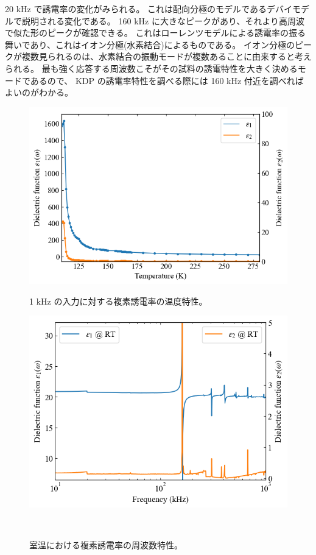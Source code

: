 \documentclass[9pt,dvipdfmx,a4paper]{jsarticle}
\begin{document}
20 kHz で誘電率の変化がみられる。
これは配向分極のモデルであるデバイモデルで説明される変化である。
160 kHz に大きなピークがあり、それより高周波で似た形のピークが確認できる。
これはローレンツモデルによる誘電率の振る舞いであり、これはイオン分極(水素結合)によるものである\cite{onodera}。
イオン分極のピークが複数見られるのは、水素結合の振動モードが複数あることに由来すると考えられる。
最も強く応答する周波数こそがその試料の誘電特性を大きく決めるモードであるので、
KDP の誘電率特性を調べる際には 160 kHz 付近を調べればよいのがわかる。
\begin{figure}[t]
    \centering
    \begin{minipage}[t]{0.48\columnwidth}
        \centering
        \includegraphics[width = \columnwidth]{epsilon-Temp.png}
        \caption{\small{1 kHz の入力に対する複素誘電率の温度特性。}}
        \label{graph:epsilon-Temp}
    \end{minipage}
    \hfill
    \begin{minipage}[t]{0.48\columnwidth}
        \centering
        \includegraphics[width = \columnwidth]{epsilon-f_RT.png}
        \caption{\small{室温における複素誘電率の周波数特性。}}
        \label{graph:epsilon-f_RT}
    \end{minipage}\\


\end{figure}
\end{document}
